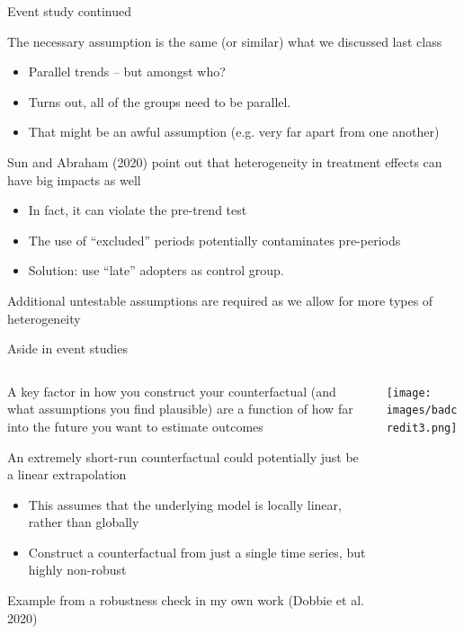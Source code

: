 \documentclass[notes,11pt, aspectratio=169]{beamer}
\newenvironment{wideitemize}{\itemize\addtolength{\itemsep}{10pt}}{\enditemize}
\begin{document}
\begin{frame}{Event study continued}
  \begin{wideitemize}
  \item The necessary assumption is the same (or similar) what we discussed last class
    \begin{itemize}
    \item Parallel trends -- but amongst who?
    \item Turns out, all of the groups need to be parallel.
    \item That might be an awful assumption (e.g. very far apart from
      one another)
    \end{itemize}
  \item Sun and Abraham (2020) point out that heterogeneity in
    treatment effects can have big impacts as well
    \begin{itemize}
    \item In fact, it can violate the pre-trend test
    \item The use of ``excluded'' periods potentially contaminates pre-periods
    \item Solution: use ``late'' adopters as control group. 
    \end{itemize}
    \item Additional untestable assumptions are required as we allow for more types of heterogeneity
  \end{wideitemize}
\end{frame}

\begin{frame}{Aside in event studies}
  \begin{columns}[T] %
    \begin{column}{0.5\textwidth}
  \begin{wideitemize}
  \item A key factor in how you construct your counterfactual (and
    what assumptions you find plausible) are a function of how far
    into the future you want to estimate outcomes
  \item An extremely short-run counterfactual could potentially just be a linear extrapolation
    \begin{itemize}
    \item This assumes that the underlying model is locally linear,
      rather than globally
    \item Construct a counterfactual from just
      a single time series, but highly non-robust
    \end{itemize}
  \item Example from a robustness check in my own work (Dobbie et al. 2020)
  \end{wideitemize}
    \end{column}%
    \hfill%
    \begin{column}{.5\textwidth}
\texttt{[image: images/badcredit3.png]}        
    \end{column}%
  \end{columns}
  
\end{frame}
\end{document}
